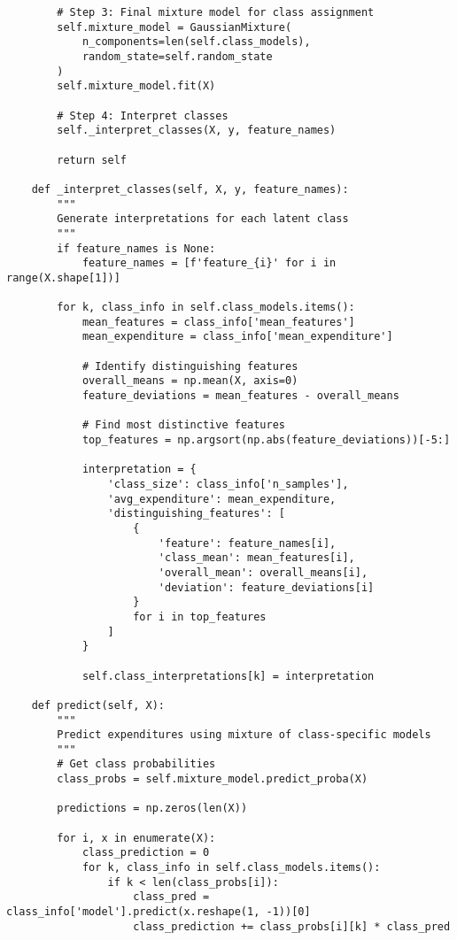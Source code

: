 \begin{lstlisting}
        # Step 3: Final mixture model for class assignment
        self.mixture_model = GaussianMixture(
            n_components=len(self.class_models),
            random_state=self.random_state
        )
        self.mixture_model.fit(X)
        
        # Step 4: Interpret classes
        self._interpret_classes(X, y, feature_names)
        
        return self
    
    def _interpret_classes(self, X, y, feature_names):
        """
        Generate interpretations for each latent class
        """
        if feature_names is None:
            feature_names = [f'feature_{i}' for i in range(X.shape[1])]
        
        for k, class_info in self.class_models.items():
            mean_features = class_info['mean_features']
            mean_expenditure = class_info['mean_expenditure']
            
            # Identify distinguishing features
            overall_means = np.mean(X, axis=0)
            feature_deviations = mean_features - overall_means
            
            # Find most distinctive features
            top_features = np.argsort(np.abs(feature_deviations))[-5:]
            
            interpretation = {
                'class_size': class_info['n_samples'],
                'avg_expenditure': mean_expenditure,
                'distinguishing_features': [
                    {
                        'feature': feature_names[i],
                        'class_mean': mean_features[i],
                        'overall_mean': overall_means[i],
                        'deviation': feature_deviations[i]
                    }
                    for i in top_features
                ]
            }
            
            self.class_interpretations[k] = interpretation
    
    def predict(self, X):
        """
        Predict expenditures using mixture of class-specific models
        """
        # Get class probabilities
        class_probs = self.mixture_model.predict_proba(X)
        
        predictions = np.zeros(len(X))
        
        for i, x in enumerate(X):
            class_prediction = 0
            for k, class_info in self.class_models.items():
                if k < len(class_probs[i]):
                    class_pred = class_info['model'].predict(x.reshape(1, -1))[0]
                    class_prediction += class_probs[i][k] * class_pred
            

\end{lstlisting}

